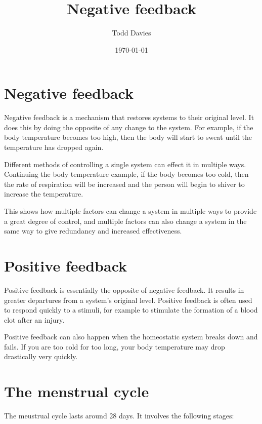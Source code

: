 \documentclass{article}
\title{Negative feedback}
\author{Todd Davies}
\date{\today}
\begin{document}
\lhead{\today}

\maketitle

\section*{Negative feedback}
\thispagestyle{empty}

Negative feedback is a mechanism that restores systems to their original level.
It does this by doing the opposite of any change to the system. For example, if
the body temperature becomes too high, then the body will start to sweat until
the temperature has dropped again.

Different methods of controlling a single system can effect it in multiple ways.
Continuing the body temperature example, if the body becomes too cold, then the
rate of respiration will be increased and the person will begin to shiver to
increase the temperature.

This shows how multiple factors can change a system in multiple ways to provide
a great degree of control, and multiple factors can also change a system in the
same way to give redundancy and increased effectiveness.

\section*{Positive feedback}

Positive feedback is essentially the opposite of negative feedback. It results
in greater departures from a system's original level. Positive feedback is often
used to respond quickly to a stimuli, for example to stimulate the formation of
a blood clot after an injury.

Positive feedback can also happen when the homeostatic system breaks down and
fails. If you are too cold for too long, your body temperature may drop
drastically very quickly.

\section*{The menstrual cycle}

The meustrual cycle lasts around 28 days. It involves the following stages:
\end{document}
